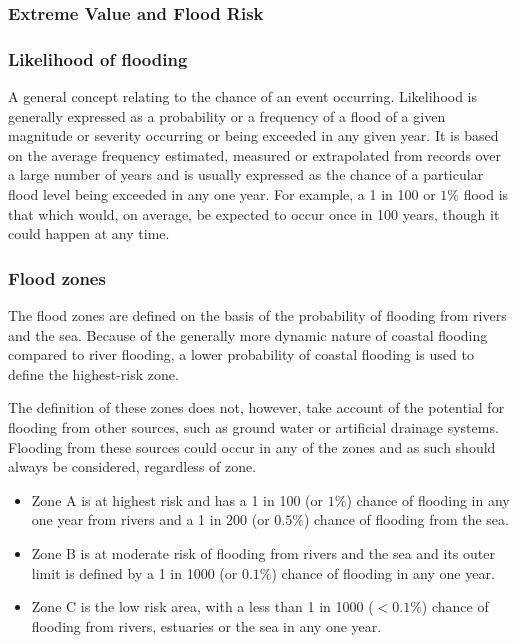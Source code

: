 \documentclass[MAIN.tex]{subfiles}
\begin{document}
 
	\frametitle{Extreme Value and Flood Risk}
	
	\begin{frame}
		\frametitle{ Likelihood of flooding}
		A general concept relating to the chance of an event occurring. Likelihood is generally expressed as a probability or a frequency of a flood of a given
		magnitude or severity occurring or being exceeded in any given year. It is based on the average frequency estimated, measured or extrapolated from records over a large number of years and is usually expressed as the chance of a particular flood level being exceeded
		in any one year. For example, a 1 in 100 or $1\%$ flood is that which would, on average, be expected to occur
		once in 100 years, though it could happen at any time.
	\end{frame}
	\begin{frame}
		\frametitle{ Flood zones}
		
		The flood zones are defined on the basis of the probability of flooding from
		rivers and the sea. Because of the generally more dynamic nature of coastal
		flooding compared to river flooding, a lower probability of coastal flooding is
		used to define the highest-risk zone.
		
		
		The definition of these zones does not, however, take account of the potential
		for flooding from other sources, such as ground water or artificial drainage
		systems. Flooding from these sources could occur in any of the zones and as
		such should always be considered, regardless of zone.
		
	\end{frame}
	\begin{frame}
		\begin{itemize}
			\item Zone A is at highest risk and has a 1 in 100 (or $1\%$) chance of flooding in any
			one year from rivers and a 1 in 200 (or $0.5\%$) chance of flooding from the
			sea.
			\item Zone B is at moderate risk of flooding from rivers and the sea and its outer limit
			is defined by a 1 in 1000 (or $0.1\%$) chance of flooding in any one year.
			\item Zone C is the low risk area, with a less than 1 in 1000 ($<0.1\%$) chance of
			flooding from rivers, estuaries or the sea in any one year.
		\end{itemize}
	\end{frame}
\end{document}
